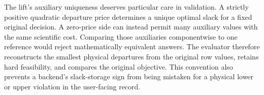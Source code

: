 The lift's auxiliary uniqueness deserves particular care in validation. A
strictly positive quadratic departure price determines a unique optimal slack
for a fixed original decision. A zero-price side can instead permit many
auxiliary values with the same scientific cost. Comparing those auxiliaries
componentwise to one reference would reject mathematically equivalent answers.
The evaluator therefore reconstructs the smallest physical departures from
the original row values, retains hard feasibility, and compares the original
objective. This convention also prevents a backend's slack-storage sign from
being mistaken for a physical lower or upper violation in the user-facing
record.

